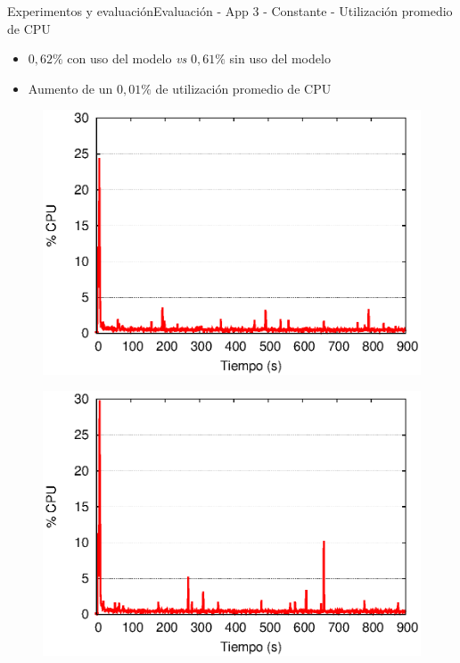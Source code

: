 \begin{frame}{Experimentos y evaluación}{Evaluación - App 3 - Constante - Utilización promedio de CPU}

\begin{itemize}
\item $0,62\%$ con uso del modelo \textit{vs} $0,61\%$ sin uso del modelo
\item Aumento de un $0,01\%$ de utilización promedio de CPU
\end{itemize}

\begin{multicols}{2}
\begin{figure}[p]
	\centering
	\includegraphics[scale=0.475]{images/exp/app3/cm/fisical/consumeCPU.eps}
\end{figure}

\begin{figure}[p]
	\centering
	\includegraphics[scale=0.475]{images/exp/app3/sm/fisical/consumeCPU.eps}
\end{figure}
\end{multicols}
\end{frame}

